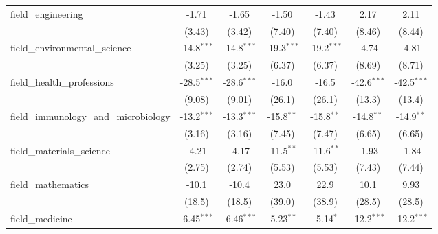 \begin{tabular}{lcccccc}
   field\_engineering                                          & -1.71          & -1.65         & -1.50          & -1.43          & 2.17          & 2.11\\   
                                                               & (3.43)         & (3.42)        & (7.40)         & (7.40)         & (8.46)        & (8.44)\\   
   field\_environmental\_science                               & -14.8$^{***}$  & -14.8$^{***}$ & -19.3$^{***}$  & -19.2$^{***}$  & -4.74         & -4.81\\   
                                                               & (3.25)         & (3.25)        & (6.37)         & (6.37)         & (8.69)        & (8.71)\\   
   field\_health\_professions                                  & -28.5$^{***}$  & -28.6$^{***}$ & -16.0          & -16.5          & -42.6$^{***}$ & -42.5$^{***}$\\   
                                                               & (9.08)         & (9.01)        & (26.1)         & (26.1)         & (13.3)        & (13.4)\\   
   field\_immunology\_and\_microbiology                        & -13.2$^{***}$  & -13.3$^{***}$ & -15.8$^{**}$   & -15.8$^{**}$   & -14.8$^{**}$  & -14.9$^{**}$\\   
                                                               & (3.16)         & (3.16)        & (7.45)         & (7.47)         & (6.65)        & (6.65)\\   
   field\_materials\_science                                   & -4.21          & -4.17         & -11.5$^{**}$   & -11.6$^{**}$   & -1.93         & -1.84\\   
                                                               & (2.75)         & (2.74)        & (5.53)         & (5.53)         & (7.43)        & (7.44)\\   
   field\_mathematics                                          & -10.1          & -10.4         & 23.0           & 22.9           & 10.1          & 9.93\\   
                                                               & (18.5)         & (18.5)        & (39.0)         & (38.9)         & (28.5)        & (28.5)\\   
   field\_medicine                                             & -6.45$^{***}$  & -6.46$^{***}$ & -5.23$^{**}$   & -5.14$^{*}$    & -12.2$^{***}$ & -12.2$^{***}$\\   

\end{tabular}
